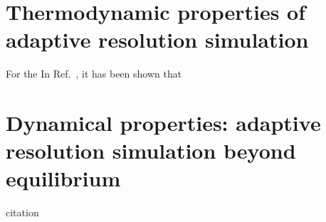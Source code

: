 \documentclass[epjST]{svjour}
\begin{document}
      



\section{Thermodynamic properties of adaptive resolution simulation}
\label{sec:thermodynamic}

For the 
In Ref.~\cite{wang2013grand}, it has been shown that



\section{Dynamical properties: adaptive resolution simulation beyond equilibrium}
citation~\cite{wang2014exploring}

{}


\end{document}

